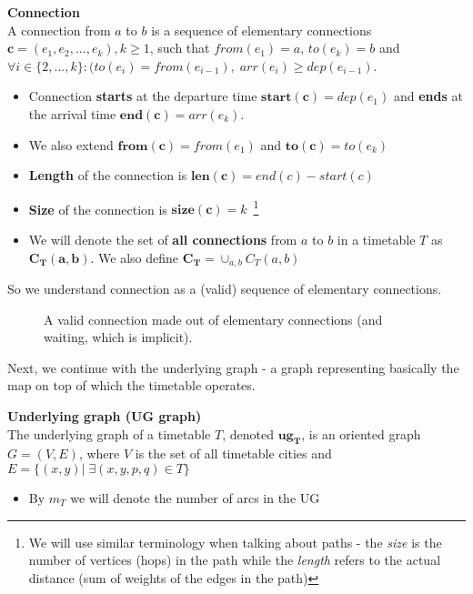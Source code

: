    	\begin{definition}
        \textbf{Connection} \\
        A connection from $a$ to $b$ is a sequence of elementary connections $\bm{c} = (e_{1}, e_{2}, ..., e_{k}), k \geq 1$, such that $from(e_{1}) = a$, $to(e_{k}) = b$ and $\forall i \in \{2, ..., k\}: (to(e_{i}) = from(e_{i - 1}), \; arr(e_{i}) \geq dep(e_{i - 1})$.
        \begin{itemize}
			\item Connection \textbf{starts} at the departure time $\bm{start(c)} = dep(e_{1})$ and \textbf{ends} at the arrival time $\bm{end(c)} = arr(e_{k})$.
			\item We also extend $\bm{from(c)} = from(e_{1})$ and $\bm{to(c)} = to(e_{k})$
	        \item \textbf{Length} of the connection is $\bm{len(c)} = end(c) - start(c)$
	        \item \textbf{Size} of the connection is $\bm{size(c)} = k$~\footnote{We will use similar terminology when talking about paths - the \textit{size} is the number of vertices (hops) in the path while the \textit{length} refers to the actual distance (sum of weights of the edges in the path)}
	        \item We will denote the set of \textbf{all connections} from $a$ to $b$ in a timetable $T$ as $\bm{C_{T}(a, b)}$. We also define $\bm{C_{T}} = \cup_{a, b} C_{T}(a, b)$
        \end{itemize}
    \end{definition}
    
    \noindent So we understand connection as a (valid) sequence of elementary connections. 
    
    \begin{figure}[h!]
        \begin{center}
        \end{center}
		\caption{\label{pic:conn} A valid connection made out of \textcolor{elcon-clr}{elementary connections} (and \textcolor{waiting-clr}{waiting}, which is implicit).}
	\end{figure}
	
	\noindent Next, we continue with the underlying graph - a graph representing basically the map on top of which the timetable operates.
	
	\begin{definition}
        \textbf{Underlying graph (UG graph)} \\
        The underlying graph of a timetable $T$, denoted $\bm{ug_{T}}$, is an oriented graph $G = (V, E)$, where $V$ is the set of all timetable cities and $E = \{(x, y)|\; \exists (x, y, p, q) \in T\}$
        \begin{itemize}
        	\item By $m_{T}$ we will denote the number of arcs in the UG
        \end{itemize}
    \end{definition}
    

